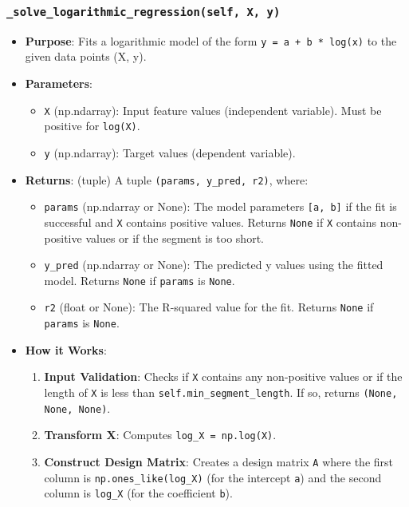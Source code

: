 \documentclass[12pt,a4paper]{report}
\begin{document}
{\subsubsection{\texttt{\_solve\_logarithmic\_regression(self, X, y)}}
\begin{itemize}
    \item \textbf{Purpose}: Fits a logarithmic model of the form \texttt{y = a + b * log(x)} to the given data points (X, y).
    \item \textbf{Parameters}:
        \begin{itemize}
            \item \texttt{X} (np.ndarray): Input feature values (independent variable). Must be positive for \texttt{log(X)}.
            \item \texttt{y} (np.ndarray): Target values (dependent variable).
        \end{itemize}
    \item \textbf{Returns}: (tuple) A tuple \texttt{(params, y\_pred, r2)}, where:
        \begin{itemize}
            \item \texttt{params} (np.ndarray or None): The model parameters \texttt{[a, b]} if the fit is successful and \texttt{X} contains positive values. Returns \texttt{None} if \texttt{X} contains non-positive values or if the segment is too short.
            \item \texttt{y\_pred} (np.ndarray or None): The predicted y values using the fitted model. Returns \texttt{None} if \texttt{params} is \texttt{None}.
            \item \texttt{r2} (float or None): The R-squared value for the fit. Returns \texttt{None} if \texttt{params} is \texttt{None}.
        \end{itemize}
    \item \textbf{How it Works}:
        \begin{enumerate}
            \item \textbf{Input Validation}: Checks if \texttt{X} contains any non-positive values or if the length of \texttt{X} is less than \texttt{self.min\_segment\_length}. If so, returns \texttt{(None, None, None)}.
            \item \textbf{Transform X}: Computes \texttt{log\_X = np.log(X)}.
            \item \textbf{Construct Design Matrix}: Creates a design matrix \texttt{A} where the first column is \texttt{np.ones\_like(log\_X)} (for the intercept \texttt{a}) and the second column is \texttt{log\_X} (for the coefficient \texttt{b}).

\end{enumerate}
\end{itemize}}
\end{document}
